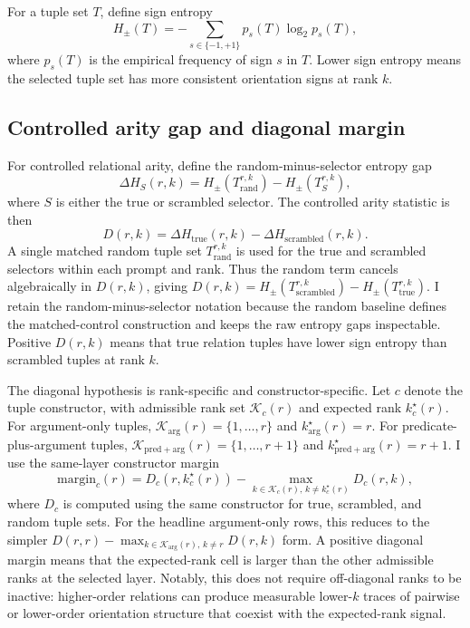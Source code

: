 \documentclass[11pt]{article}
\newcommand{\Hpm}{H_{\pm}}
\begin{document}
For a tuple set $T$, define sign entropy
\begin{equation}
\Hpm(T) = -\sum_{s \in \{-1,+1\}} p_s(T) \log_2 p_s(T),
\end{equation}
where $p_s(T)$ is the empirical frequency of sign $s$ in $T$. Lower sign entropy means the selected tuple set has more consistent orientation signs at rank $k$.

\subsection{Controlled arity gap and diagonal margin}

For controlled relational arity, define the random-minus-selector entropy gap
\begin{equation}
\Delta H_S(r,k)=\Hpm(T_{\mathrm{rand}}^{r,k})-\Hpm(T_S^{r,k}),
\end{equation}
where $S$ is either the true or scrambled selector. The controlled arity statistic is then
\begin{equation}
D(r,k)=\Delta H_{\mathrm{true}}(r,k)-\Delta H_{\mathrm{scrambled}}(r,k).
\end{equation}
A single matched random tuple set $T_{\mathrm{rand}}^{r,k}$ is used for the true and scrambled selectors within each prompt and rank. Thus the random term cancels algebraically in $D(r,k)$, giving $D(r,k)=\Hpm(T_{\mathrm{scrambled}}^{r,k})-\Hpm(T_{\mathrm{true}}^{r,k})$. I retain the random-minus-selector notation because the random baseline defines the matched-control construction and keeps the raw entropy gaps inspectable. Positive $D(r,k)$ means that true relation tuples have lower sign entropy than scrambled tuples at rank $k$.

The diagonal hypothesis is rank-specific and constructor-specific. Let $c$ denote the tuple constructor, with admissible rank set $\mathcal{K}_c(r)$ and expected rank $k_c^\star(r)$. For argument-only tuples, $\mathcal{K}_{\mathrm{arg}}(r)=\{1,\ldots,r\}$ and $k_{\mathrm{arg}}^\star(r)=r$. For predicate-plus-argument tuples, $\mathcal{K}_{\mathrm{pred+arg}}(r)=\{1,\ldots,r+1\}$ and $k_{\mathrm{pred+arg}}^\star(r)=r+1$. I use the same-layer constructor margin
\begin{equation}
\mathrm{margin}_c(r)=D_c\!\left(r,k_c^\star(r)\right)
-\max_{k\in\mathcal{K}_c(r),\, k \neq k_c^\star(r)}D_c(r,k),
\end{equation}
where $D_c$ is computed using the same constructor for true, scrambled, and random tuple sets. For the headline argument-only rows, this reduces to the simpler $D(r,r)-\max_{k\in\mathcal{K}_{\mathrm{arg}}(r),\,k\neq r}D(r,k)$ form. A positive diagonal margin means that the expected-rank cell is larger than the other admissible ranks at the selected layer. Notably, this does not require off-diagonal ranks to be inactive: higher-order relations can produce measurable lower-$k$ traces of pairwise or lower-order orientation structure that coexist with the expected-rank signal.
\end{document}
